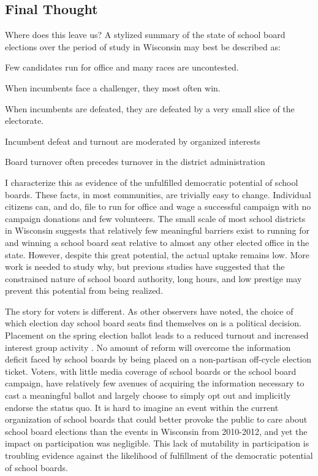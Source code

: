 \subsection{Final Thought}

Where does this leave us? A stylized summary of the state of school board elections over the 
period of study in Wisconsin may best be described as: 

\begin{myitemize}
\item Few candidates run for office and many races are uncontested.
\item When incumbents face a challenger, they most often win.
\item When incumbents are defeated, they are defeated by a very small slice of the electorate.
\item Incumbent defeat and turnout are moderated by organized interests 
\item Board turnover often precedes turnover in the district administration
\end{myitemize}

I characterize this as evidence of the unfulfilled democratic potential of school 
boards. These facts, in most communities, are trivially easy to change. Individual 
citizens can, and do, file to run for office and wage a successful campaign with 
no campaign donations and few volunteers. The small scale of most school districts 
in Wisconsin suggests that relatively few meaningful barriers exist to running for 
and winning a school board seat relative to almost any other elected office in the 
state. However, despite this great potential, the actual uptake remains low. More 
work is needed to study why, but previous studies have suggested that the constrained 
nature of school board authority, long hours, and low prestige may prevent this 
potential from being realized. 

The story for voters is different. As other observers have noted, the choice of 
which election day school board seats find themselves on is a political decision. 
Placement on the spring election ballot leads to a reduced turnout and increased 
interest group activity \citep{anzia11}.
No amount of reform will overcome the information deficit faced by school boards 
by being placed on a non-partisan off-cycle election ticket. Voters, with little 
media coverage of school boards or the school board campaign, have relatively few 
avenues of acquiring the information necessary to cast a meaningful ballot and 
largely choose to simply opt out and implicitly endorse the status quo. It is 
hard to imagine an event within the current organization of school boards that 
could better provoke the public to care about school board elections than the 
events in Wisconsin from 2010-2012, and yet the impact on participation was 
negligible. This lack of mutability in participation is troubling evidence against 
the likelihood of fulfillment of the democratic potential of school boards. 

